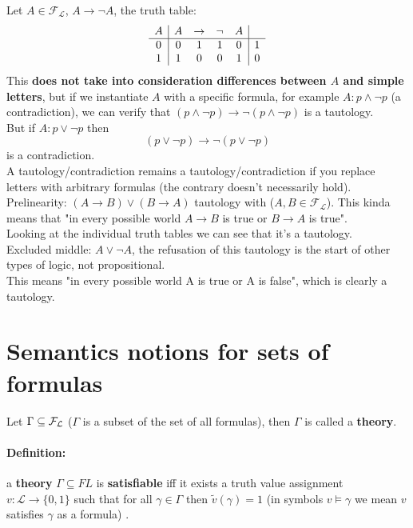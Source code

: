 \documentclass[11pt]{article}
\begin{document}
	Let $A \in \mathcal{F}_\mathcal{L}$, $A \rightarrow \neg A$, the truth table:
	$$
	\begin{array}{c | c c c c | c}
		A & A & \rightarrow & \neg & A & \\
		\hline
		0 & 0 & 1 & 1 & 0 & 1\\
		1 & 1 & 0 & 0 & 1 & 0\\
	\end{array}
	$$
	This \textbf{does not take into consideration differences between $A$ and simple letters}, but if we instantiate $A$ with a specific formula, for example $A: p \wedge \neg p$ (a contradiction), we can verify that $(p \wedge \neg p) \rightarrow \neg (p \wedge \neg p) $ is a tautology.\\
	
	But if $A: p \vee \neg p$ then 
	$$ (p \vee \neg p) \rightarrow \neg (p \vee \neg p) $$
	is a contradiction.\\
	
	A tautology/contradiction remains a tautology/contradiction if you replace letters with arbitrary formulas (the contrary doesn't necessarily hold).\\
	
	Prelinearity: $(A \rightarrow B) \vee (B \rightarrow A)$ tautology with ($A, B  \in \mathcal{F}_\mathcal{L}$). This kinda means that "in every possible world $A \rightarrow B$ is true or $B \rightarrow A$ is true".\\
	Looking at the individual truth tables we can see that it's a tautology.\\
	
	Excluded middle: $A \vee \neg A$, the refusation of this tautology is the start of other types of logic, not propositional.\\
	This means "in every possible world A is true or A is false", which is clearly a tautology.\\
	
	\newpage
	
	
	\section{Semantics notions for sets of formulas}
	
	Let $\Gamma \subseteq \mathcal{F}_\mathcal{L}$ ($\Gamma$ is a subset of the set of all formulas), then $\Gamma$ is called a \textbf{theory}.\\
	
	\paragraph{Definition:} a \textbf{theory} $\Gamma \subseteq FL$ is \textbf{satisfiable} iff it exists a truth value assignment $v: \mathcal{L} \rightarrow \{0,1\}$ such that for all $\gamma \in \Gamma$ then $\tilde{v} (\gamma) = 1$ (in symbols $v \models \gamma$ we mean $v$ satisfies $\gamma$ as a formula) .\\
	
\end{document}
